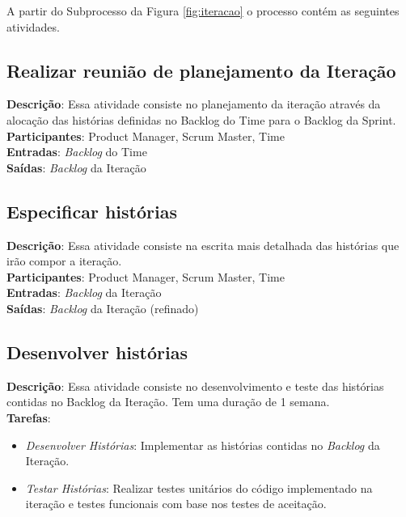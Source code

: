A partir do Subprocesso da Figura \ref{fig:iteracao} o processo contém as seguintes atividades.

\subsection{Realizar reunião de planejamento da Iteração}
  \textbf{Descrição}: Essa atividade consiste no planejamento da iteração através da alocação das histórias definidas no Backlog do Time para o Backlog da Sprint. \\
  
  \textbf{Participantes}: Product Manager, Scrum Master, Time\\
  
  \textbf{Entradas}: \textit{Backlog} do Time \\
  
  \textbf{Saídas}:  \textit{Backlog} da Iteração\\

\subsection{Especificar histórias}
  \textbf{Descrição}: Essa atividade consiste na escrita mais detalhada das histórias que irão compor a 
iteração. \\
  
  \textbf{Participantes}: Product Manager, Scrum Master, Time\\
  
  \textbf{Entradas}: \textit{Backlog} da Iteração \\
  
  \textbf{Saídas}:   \textit{Backlog} da Iteração (refinado)\\

\subsection{Desenvolver histórias}
  \textbf{Descrição}: Essa atividade consiste no desenvolvimento e teste das histórias contidas no Backlog da Iteração. Tem uma duração de 1 semana. \\
  
  \textbf{Tarefas}: 
  
  \begin{itemize}
    \item \indent \textit{Desenvolver Histórias}: Implementar as histórias contidas no \textit{Backlog} da Iteração.
   
   \item \indent \textit{Testar Histórias}: Realizar testes unitários do código implementado na iteração e testes funcionais
   com base nos testes de aceitação.
  \end{itemize}
  
